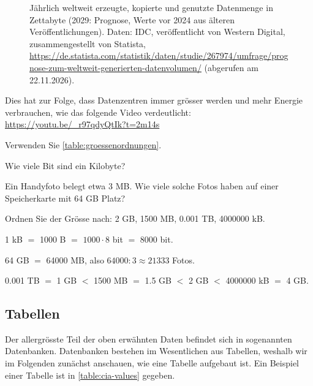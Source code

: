 \begin{figure}[H]
  \centering
  
  \caption[Entwicklung der weltweiten Datenmenge]{Jährlich weltweit erzeugte, kopierte und genutzte Datenmenge in Zettabyte (2029: Prognose, Werte vor 2024 aus älteren Veröffentlichungen). Daten: IDC, veröffentlicht von Western Digital, zusammengestellt von Statista, \url{https://de.statista.com/statistik/daten/studie/267974/umfrage/prognose-zum-weltweit-generierten-datenvolumen/} (abgerufen am 22.11.2026).}
  \label{fig:daten-global}
\end{figure}

Dies hat zur Folge, dass Datenzentren immer grösser werden und mehr Energie verbrauchen, wie das folgende Video
verdeutlicht: \url{https://youtu.be/_r97qdyQtIk?t=2m14s}

\begin{myexercise}\label{myexercise:bits-bytes}
  Verwenden Sie \cref{table:groessenordnungen}.
  \begin{aenum}
    \item Wie viele Bit sind ein Kilobyte?
    \item Ein Handyfoto belegt etwa 3 MB. Wie viele solche Fotos haben auf einer Speicherkarte mit 64 GB Platz?
    \item Ordnen Sie der Grösse nach: 2 GB, 1500 MB, 0.001 TB, \num{4000000} kB.
  \end{aenum}
  \begin{myanswer}
    \begin{aenum}
      \item 1 kB $=$ \num{1000} B $=$ $\num{1000}\cdot 8$ bit $=$ \num{8000} bit.
      \item 64 GB $=$ \num{64000} MB, also $\num{64000} : 3 \approx \num{21333}$ Fotos.
      \item 0.001 TB $=$ 1 GB $<$ 1500 MB $=$ 1.5 GB $<$ 2 GB $<$ \num{4000000} kB $=$ 4 GB.
    \end{aenum}
  \end{myanswer}
\end{myexercise}

\subsection{Tabellen}
\label{subsec:tables}
Der allergrösste Teil der oben erwähnten Daten befindet sich in sogenannten Datenbanken. Datenbanken bestehen im Wesentlichen aus Tabellen, weshalb wir im Folgenden zunächst anschauen, wie eine Tabelle aufgebaut ist. Ein Beispiel einer Tabelle ist in \cref{table:cia-values} gegeben.

